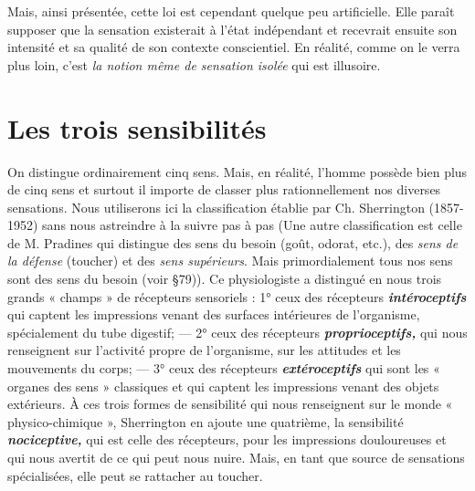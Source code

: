 Mais, ainsi présentée, cette loi est cependant quelque peu artificielle.
Elle paraît supposer que la sensation existerait à l’état indépendant
et recevrait ensuite son intensité et sa qualité de son contexte
conscientiel. En réalité, comme on le verra plus loin, c’est {\it la notion
même de sensation isolée} qui est illusoire.

\section{Les trois sensibilités}%
On distingue ordinairement cinq
sens. Mais, en réalité, l’homme possède bien plus de cinq sens et
surtout il importe de classer plus rationnellement nos diverses sensations.
Nous utiliserons ici la classification établie par Ch. Sherrington
(1857-1952) sans nous astreindre à la suivre pas à pas
{\scriptsize (Une autre classification est celle de M. Pradines qui distingue des sens du besoin
(goût, odorat, etc.), des {\it sens de la défense} (toucher) et des {\it sens supérieurs}. Mais
primordialement tous nos sens sont des sens du besoin (voir \S 79))}.
Ce physiologiste
a distingué en nous trois grands « champs » de récepteurs
sensoriels : 1° ceux des récepteurs \textbf{\textit {intéroceptifs}} qui captent les
impressions venant des surfaces intérieures de l’organisme, spécialement
du tube digestif; — 2° ceux des récepteurs \textbf{\textit {proprioceptifs,}}
qui nous renseignent sur l’activité propre de l’organisme, sur les
attitudes et les mouvements du corps; — 3° ceux des récepteurs
\textbf{\textit {extéroceptifs}} qui sont les « organes des sens » classiques et qui captent
les impressions venant des objets extérieurs. À ces trois formes de
sensibilité qui nous renseignent sur le monde « physico-chimique »,
Sherrington en ajoute une quatrième, la sensibilité \textbf{\textit {nociceptive,}} qui
est celle des récepteurs, pour les impressions douloureuses et qui nous
avertit de ce qui peut nous nuire. Mais, en tant que source de sensations
spécialisées, elle peut se rattacher au toucher.

